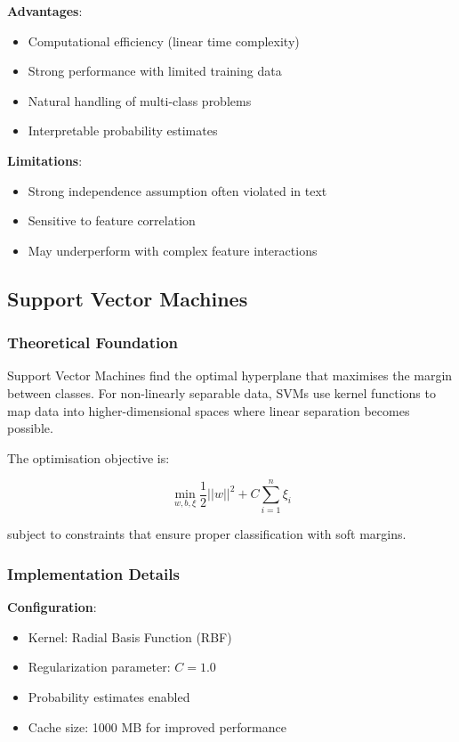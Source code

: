 \documentclass[11pt,a4paper]{article}
\begin{document}
\textbf{Advantages}:
\begin{itemize}
    \item Computational efficiency (linear time complexity)
    \item Strong performance with limited training data
    \item Natural handling of multi-class problems
    \item Interpretable probability estimates
\end{itemize}

\textbf{Limitations}:
\begin{itemize}
    \item Strong independence assumption often violated in text
    \item Sensitive to feature correlation
    \item May underperform with complex feature interactions
\end{itemize}

\subsection{Support Vector Machines}

\subsubsection{Theoretical Foundation}

Support Vector Machines find the optimal hyperplane that maximises the margin between classes. For non-linearly separable data, SVMs use kernel functions to map data into higher-dimensional spaces where linear separation becomes possible.

The optimisation objective is:

\begin{equation}
\min_{w,b,\xi} \frac{1}{2}||w||^2 + C\sum_{i=1}^{n}\xi_i
\end{equation}

subject to constraints that ensure proper classification with soft margins.

\subsubsection{Implementation Details}

\textbf{Configuration}:
\begin{itemize}
    \item Kernel: Radial Basis Function (RBF)
    \item Regularization parameter: $C = 1.0$
    \item Probability estimates enabled
    \item Cache size: 1000 MB for improved performance
\end{itemize}
\end{document}

